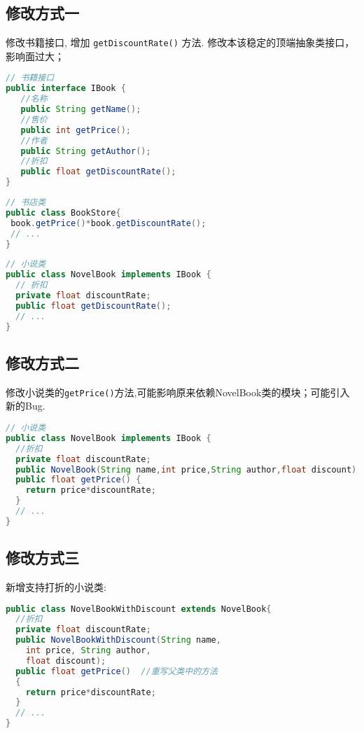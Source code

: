 \documentclass[../main.tex]{subfiles}
\begin{document}
\subsection{修改方式一}
修改书籍接口, 增加 \texttt{getDiscountRate()} 方法.
修改本该稳定的顶端抽象类接口，影响面过大；
\begin{lstlisting}[language=java]
// 书籍接口
public interface IBook {
   //名称
   public String getName();
   //售价
   public int getPrice();
   //作者
   public String getAuthor();
   //折扣
   public float getDiscountRate();
}
\end{lstlisting}
\begin{lstlisting}[language=java]
// 书店类
public class BookStore{
 book.getPrice()*book.getDiscountRate();
 // ...
}
\end{lstlisting}
\begin{lstlisting}[language=java]
// 小说类
public class NovelBook implements IBook {
  // 折扣
  private float discountRate;
  public float getDiscountRate();
  // ...
}
\end{lstlisting}
\subsection{修改方式二}
修改小说类的\texttt{getPrice()}方法,可能影响原来依赖NovelBook类的模块；可能引入新的Bug.
\begin{lstlisting}[language=java]
// 小说类
public class NovelBook implements IBook {
  //折扣
  private float discountRate;
  public NovelBook(String name,int price,String author,float discount);
  public float getPrice() {
    return price*discountRate;
  }
  // ...
}
\end{lstlisting}
\subsection{修改方式三}
新增支持打折的小说类:
\begin{lstlisting}[language=java]
public class NovelBookWithDiscount extends NovelBook{
  //折扣
  private float discountRate;
  public NovelBookWithDiscount(String name,
    int price, String author,
    float discount);
  public float getPrice()  //重写父类中的方法
  {
    return price*discountRate;
  }
  // ...
}
\end{lstlisting}
\end{document}
